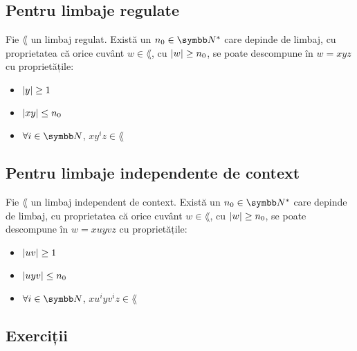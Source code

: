 \subsection*{Pentru limbaje regulate}

Fie \(\lang\) un limbaj regulat. Există un \(n_0 \in \naturals^*\) care depinde de limbaj, cu proprietatea că orice cuvânt \(w \in \lang\), cu \(\left\lvert w\right\rvert \geq n_0\), se poate descompune în \(w = x y z\) cu proprietățile:
\begin{itemize}
    \item \(\left\lvert y\right\rvert \geq 1\)
    \item \(\left\lvert xy\right\rvert \leq n_0\)
    \item \(\forall i \in \naturals\), \(x y^i z \in \lang\)
\end{itemize}

\subsection*{Pentru limbaje independente de context}

Fie \(\lang\) un limbaj independent de context. Există un \(n_0 \in \naturals^*\) care depinde de limbaj, cu proprietatea că orice cuvânt \(w \in \lang\), cu \(\left\lvert w\right\rvert \geq n_0\), se poate descompune în \(w = x u y v z\) cu proprietățile:
\begin{itemize}
    \item \(\left\lvert u v\right\rvert \geq 1\)
    \item \(\left\lvert u y v\right\rvert \leq n_0\)
    \item \(\forall i \in \naturals\), \(x u^i y v^i z \in \lang\)
\end{itemize}

\subsection*{Exerciții}


